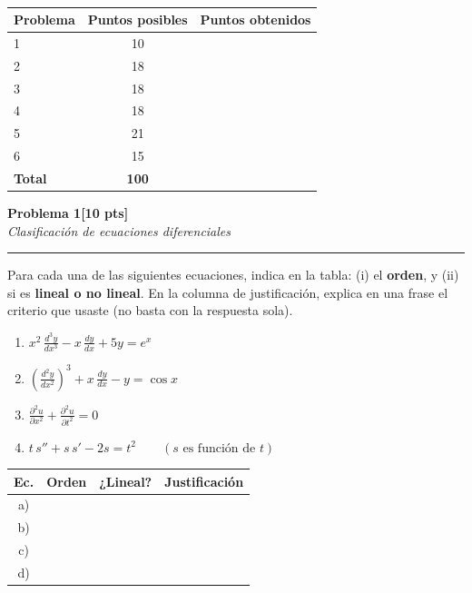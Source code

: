 \documentclass[11pt,letterpaper]{article}
\newcommand{\problema}[3]{%
  \bigskip\bigskip\noindent
  {\Large\textbf{Problema #1}}\hfill\textbf{[#2 pts]}\\[3pt]
  {\small\itshape #3}\par
  \vspace{2pt}\hrule\vspace{8pt}
}
\renewcommand{\arraystretch}{1.3}
\begin{document}
\vspace{8pt}

\\[4pt]
\begin{tabular}{lcc}
\toprule
Problema & Puntos posibles & Puntos obtenidos \\
\midrule
1 & 10 & \\
2 & 18 & \\
3 & 18 & \\
4 & 18 & \\
5 & 21 & \\
6 & 15 & \\
\midrule
\textbf{Total} & \textbf{100} & \\
\bottomrule
\end{tabular}


\problema{1}{10}{Clasificación de ecuaciones diferenciales}

Para cada una de las siguientes ecuaciones, indica en la tabla: (i) el \textbf{orden}, y (ii) si es \textbf{lineal o no lineal}. En la columna de justificación, explica en una frase el criterio que usaste (no basta con la respuesta sola).

\begin{enumerate}[label=\textbf{\alph*)}, leftmargin=2em, itemsep=10pt]
  \item $\displaystyle x^2\,\frac{d^3y}{dx^3} - x\,\frac{dy}{dx} + 5y = e^x$
  \item $\displaystyle \left(\frac{d^2y}{dx^2}\right)^{3} + x\,\frac{dy}{dx} - y = \cos x$
  \item $\displaystyle \frac{\partial^2 u}{\partial x^2} + \frac{\partial^2 u}{\partial t^2} = 0$
  \item $\displaystyle t\,s'' + s\,s' - 2s = t^2 \qquad (s \text{ es función de } t)$
\end{enumerate}

\renewcommand{\arraystretch}{2.6}
\noindent\begin{tabular}{|c|>{\centering\arraybackslash}p{1.6cm}|>{\centering\arraybackslash}p{2cm}|>{\arraybackslash}p{7.9cm}|}
\hline
\textbf{Ec.} & \textbf{Orden} & \textbf{¿Lineal?} & \textbf{Justificación} \\
\hline
a) & & & \\
\hline
b) & & & \\
\hline
c) & & & \\
\hline
d) & & & \\
\hline
\end{tabular}
\renewcommand{\arraystretch}{1.3}
\end{document}
